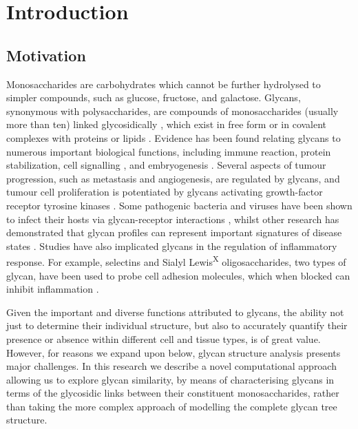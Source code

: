\documentclass[12pt,a4paper]{article}
\begin{document}
\newpage
\section{Introduction}
\label{sec:intro}


\subsection{Motivation}
\label{sec:glycan_function}
Monosaccharides are carbohydrates which cannot be further hydrolysed to simpler compounds, such as glucose, fructose, and galactose. Glycans, synonymous with polysaccharides, are compounds of monosaccharides (usually more than ten) linked glycosidically \citep{mcnaught1997compendium}, which exist in free form or in covalent complexes with proteins or lipids \citep{doi:10.1093/bioinformatics/btm090}. Evidence has been found relating glycans to numerous important biological functions, including immune reaction, protein stabilization, cell signalling \citep{bucior2004carbohydrate}, and embryogenesis \citep{rosa2002functional}. Several aspects of tumour progression, such as metastasis and angiogenesis, are regulated by glycans, and tumour cell proliferation is potentiated by glycans activating growth-factor receptor tyrosine kinases \citep{fuster2005sweet}. Some pathogenic bacteria and viruses have been shown to infect their hosts via glycan-receptor interactions \citep{cossart2004bacterial, sacks2001molecular}, whilst other research has demonstrated that glycan profiles can represent important signatures of disease states \citep{tong2003glycosylation}. Studies have also implicated glycans in the regulation of inflammatory response. For example, selectins and Sialyl Lewis\textsuperscript{X} oligosaccharides, two types of glycan, have been used to probe cell adhesion molecules, which when blocked can inhibit inflammation \citep{albelda1994adhesion}.

Given the important and diverse functions attributed to glycans, the ability not just to determine their individual structure, but also to accurately quantify their presence or absence within different cell and tissue types, is of great value. However, for reasons we expand upon below, glycan structure analysis presents major challenges. In this research we describe a novel computational approach allowing us to explore glycan similarity, by means of characterising glycans in terms of the glycosidic links between their constituent monosaccharides, rather than taking the more complex approach of modelling the complete glycan tree structure.
\end{document}
